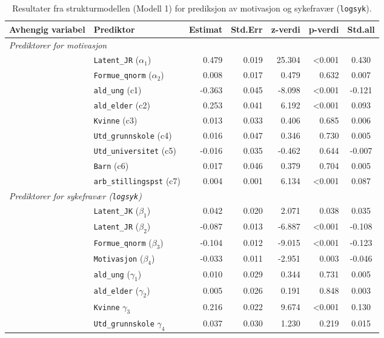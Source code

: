 \documentclass[
  12pt,
  a4paper,
  DIV=11,
  numbers=noendperiod]{scrartcl}
\begin{document}
\begin{table}[htbp]
\centering
\caption{Resultater fra strukturmodellen (Modell 1) for prediksjon av motivasjon og sykefravær (\texttt{logsyk}).}
\label{tab:sem_results_model1}
\begin{tabular}{@{}llrrrrc@{}}
\toprule
Avhengig variabel & Prediktor & Estimat & Std.Err & z-verdi & p-verdi & Std.all \\
\midrule
\multicolumn{7}{l}{\textit{Prediktorer for motivasjon}} \\
& \texttt{Latent\_JR} ($\alpha_1$) & 0.479 & 0.019 & 25.304 & <0.001 & 0.430 \\
& \texttt{Formue\_qnorm} ($\alpha_2$) & 0.008 & 0.017 & 0.479 & 0.632 & 0.007 \\
& \texttt{ald\_ung} (c1) & -0.363 & 0.045 & -8.098 & <0.001 & -0.121 \\
& \texttt{ald\_elder} (c2) & 0.253 & 0.041 & 6.192 & <0.001 & 0.093 \\
& \texttt{Kvinne} (c3) & 0.013 & 0.033 & 0.406 & 0.685 & 0.006 \\
& \texttt{Utd\_grunnskole} (c4) & 0.016 & 0.047 & 0.346 & 0.730 & 0.005 \\
& \texttt{Utd\_universitet} (c5) & -0.016 & 0.035 & -0.462 & 0.644 & -0.007 \\
& \texttt{Barn} (c6) & 0.017 & 0.046 & 0.379 & 0.704 & 0.005 \\
& \texttt{arb\_stillingspst} (c7) & 0.004 & 0.001 & 6.134 & <0.001 & 0.087 \\
\midrule
\multicolumn{7}{l}{\textit{Prediktorer for sykefravær (\texttt{logsyk})}} \\
& \texttt{Latent\_JK} ($\beta_1$) & 0.042 & 0.020 & 2.071 & 0.038 & 0.035 \\
& \texttt{Latent\_JR} ($\beta_2$) & -0.087 & 0.013 & -6.887 & <0.001 & -0.108 \\
& \texttt{Formue\_qnorm} ($\beta_3$) & -0.104 & 0.012 & -9.015 & <0.001 & -0.123 \\
& \texttt{Motivasjon} ($\beta_4$) & -0.033 & 0.011 & -2.951 & 0.003 & -0.046 \\
& \texttt{ald\_ung} ($\gamma_1$) & 0.010 & 0.029 & 0.344 & 0.731 & 0.005 \\
& \texttt{ald\_elder} ($\gamma_2$) & 0.005 & 0.026 & 0.191 & 0.848 & 0.003 \\
& \texttt{Kvinne} $\gamma_3$ & 0.216 & 0.022 & 9.674 & <0.001 & 0.130 \\
& \texttt{Utd\_grunnskole} $\gamma_4$ & 0.037 & 0.030 & 1.230 & 0.219 & 0.015 \\

\end{tabular}
\end{table}
\end{document}
